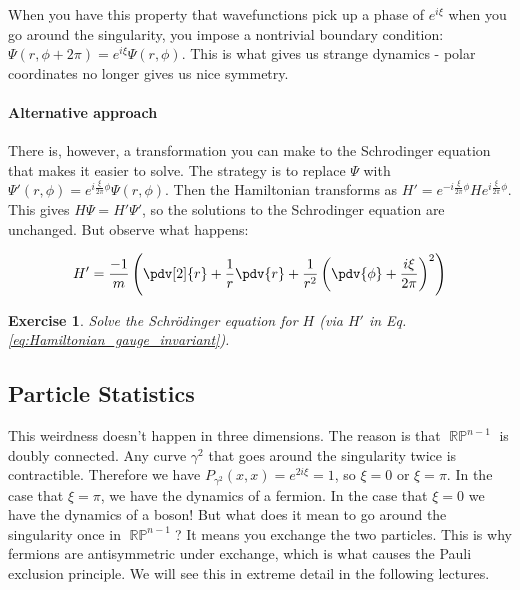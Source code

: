 \documentclass{article}
\newtheorem{exercise}{Exercise}[section]
\DeclareMathOperator{\RP}{\mathbb{RP}}
\begin{document}
When you have this property that wavefunctions pick up a phase of $e^{i\xi}$ when you go around the singularity, you impose a nontrivial boundary condition: $\Psi(r,\phi+2\pi) = e^{i\xi}\Psi(r,\phi)$. This is what gives us strange dynamics - polar coordinates no longer gives us nice symmetry. 

\paragraph*{Alternative approach}

There is, however, a transformation you can make to the Schrodinger equation that makes it easier to solve. The strategy is to replace $\Psi$ with $\Psi'(r,\phi) = e^{i\frac{\xi}{2\pi}\phi}\Psi(r,\phi)$. Then the Hamiltonian transforms as $H' = e^{-i\frac{\xi}{2\pi}\phi}H e^{i\frac{\xi}{2\pi}\phi}$. This gives $H\Psi = H'\Psi'$, so the solutions to the Schrodinger equation are unchanged. But observe what happens:

\begin{equation}
H' = \frac{-1}{m}\left(\pdv[2]{r}+\frac{1}{r}\pdv{r}+ \frac{1}{r^2}\left(\pdv{\phi}+\frac{i\xi}{2\pi}\right)^2\right)
\label{eq:Hamiltonian_gauge_invariant}
\end{equation}

\begin{exercise}
	Solve the Schr\"odinger equation for $ H $ (via $ H' $ in Eq. \eqref{eq:Hamiltonian_gauge_invariant}).
\end{exercise}

\subsection{Particle Statistics}

This weirdness doesn't happen in three dimensions. The reason is that $\RP^{n-1}$ is doubly connected. Any curve $\gamma^2$ that goes around the singularity twice is contractible. Therefore we have $P_{\gamma^2}(x,x) = e^{2i\xi}=1$, so $\xi = 0$ or $\xi = \pi$. In the case that $\xi = \pi$, we have the dynamics of a fermion. In the case that $\xi = 0$ we have the dynamics of a boson! But what does it mean to go around the singularity once in $\RP^{n-1}$? It means you exchange the two particles. This is why fermions are antisymmetric under exchange, which is what causes the Pauli exclusion principle. We will see this in extreme detail in the following lectures.
\end{document}
